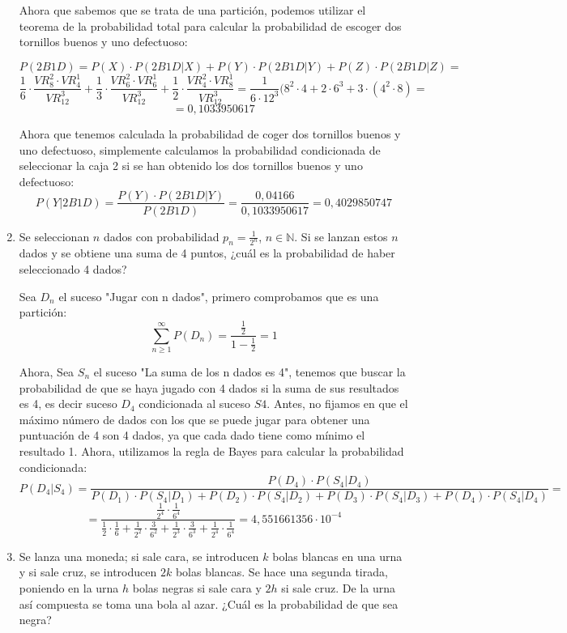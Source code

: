 \documentclass[a4paper,12pt]{article}
\begin{document}
\begin{enumerate}[label=\textbf{\arabic*.}]
    Ahora que sabemos que se trata de una partición, podemos utilizar el teorema de la probabilidad total para calcular la probabilidad de escoger dos tornillos buenos y uno defectuoso: 
    
    $$P(2B1D)=P(X)\cdot P(2B1D|X)+P(Y)\cdot P(2B1D|Y)+P(Z)\cdot P(2B1D|Z)=$$
    $$\frac{1}{6}\cdot \frac{VR_8^2\cdot VR_4^1}{VR_{12}^3}+\frac{1}{3}\cdot \frac{VR_6^2\cdot VR_6^1}{VR_{12}^3}+\frac{1}{2}\cdot \frac{VR_4^2\cdot VR_8^1}{VR_{12}^3}=\frac{1}{6\cdot 12^3}(8^2\cdot 4+2\cdot 6^3+3\cdot (4^2\cdot 8)=$$
    $$=0,1033950617$$

    Ahora que tenemos calculada la probabilidad de coger dos tornillos buenos y uno defectuoso, simplemente calculamos la probabilidad condicionada de seleccionar la caja 2 si se han obtenido los dos tornillos buenos y uno defectuoso: 
    $$P(Y|2B1D)=\frac{P(Y)\cdot P(2B1D|Y)}{P(2B1D)}=\frac{0,04166}{0,1033950617}=0,4029850747$$
    
    
    \item Se seleccionan \( n \) dados con probabilidad \( p_n = \frac{1}{2^n} \), \( n \in \mathbb{N} \). Si se lanzan estos \( n \) dados y se obtiene una suma de 4 puntos, ¿cuál es la probabilidad de haber seleccionado 4 dados?

    Sea $D_n$ el suceso "Jugar con n dados", primero comprobamos que es una partición:
    $$\sum\limits_{n\geq 1}^\infty P(D_n) = \frac{\frac{1}{2}}{1-\frac{1}{2}}=1$$
    
    Ahora, Sea $S_n$ el suceso "La suma de los n dados es 4", tenemos que buscar la probabilidad de que se haya jugado con 4 dados si la suma de sus resultados es 4, es decir suceso $D_4$ condicionada al suceso $S4$. Antes, no fijamos en que el máximo número de dados con los que se puede jugar para obtener una puntuación de 4 son 4 dados, ya que cada dado tiene como mínimo el resultado 1. Ahora, utilizamos la regla de Bayes para calcular la probabilidad condicionada:\\

    \[P(D_4|S_4)=\frac{P(D_4)\cdot P(S_4|D_4)}{P(D_1)\cdot P(S_4|D_1)+P(D_2)\cdot P(S_4|D_2)+P(D_3)\cdot P(S_4|D_3)+P(D_4)\cdot P(S_4|D_4)}=\]
    \[=\frac{\frac{1}{2^4}\cdot \frac{1}{6^4}}{\frac{1}{2}\cdot \frac{1}{6}+\frac{1}{2^2}\cdot \frac{3}{6^2}+\frac{1}{2^3}\cdot \frac{3}{6^3}+\frac{1}{2^4}\cdot \frac{1}{6^4}}=4,551661356\cdot 10^{-4}\]
    
    \item Se lanza una moneda; si sale cara, se introducen \( k \) bolas blancas en una urna y si sale cruz, se introducen \( 2k \) bolas blancas. Se hace una segunda tirada, poniendo en la urna \( h \) bolas negras si sale cara y \( 2h \) si sale cruz. De la urna así compuesta se toma una bola al azar. ¿Cuál es la probabilidad de que sea negra?


\end{enumerate}
\end{document}
